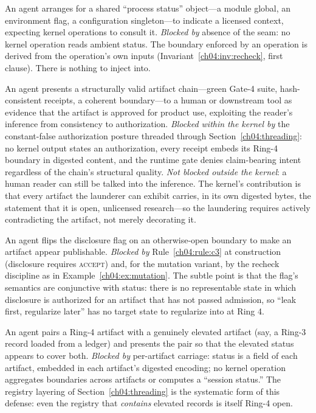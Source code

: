 \begin{example}\label{ch04:ex:ambient}
An agent arranges for a shared ``process status'' object---a module global,
an environment flag, a configuration singleton---to indicate a licensed
context, expecting kernel operations to consult it. \emph{Blocked by}
absence of the seam: no kernel operation reads ambient status. The boundary
enforced by an operation is derived from the operation's own inputs
(Invariant~\ref{ch04:inv:recheck}, first clause). There is nothing to
inject into.
\end{example}

\begin{example}\label{ch04:ex:laundering}
An agent presents a structurally valid artifact chain---green Gate-4 suite,
hash-consistent receipts, a coherent boundary---to a human or downstream
tool as evidence that the artifact is approved for product use, exploiting
the reader's inference from consistency to authorization. \emph{Blocked
within the kernel by} the constant-false authorization posture threaded
through Section~\ref{ch04:threading}: no kernel output states an
authorization, every receipt embeds its Ring-4 boundary in digested content,
and the runtime gate denies claim-bearing intent regardless of the chain's
structural quality. \emph{Not blocked outside the kernel}: a human reader
can still be talked into the inference. The kernel's contribution is that
every artifact the launderer can exhibit carries, in its own digested bytes,
the statement that it is open, unlicensed research---so the laundering
requires actively contradicting the artifact, not merely decorating it.
\end{example}

\begin{example}\label{ch04:ex:disclosure}
An agent flips the disclosure flag on an otherwise-open boundary to make an
artifact appear publishable. \emph{Blocked by} Rule~\ref{ch04:rule:c3} at
construction (disclosure requires \textsc{accept}) and, for the mutation
variant, by the recheck discipline as in Example~\ref{ch04:ex:mutation}.
The subtle point is that the flag's semantics are conjunctive with status:
there is no representable state in which disclosure is authorized for an
artifact that has not passed admission, so ``leak first, regularize later''
has no target state to regularize into at Ring 4.
\end{example}

\begin{example}\label{ch04:ex:borrowing}
An agent pairs a Ring-4 artifact with a genuinely elevated artifact (say, a
Ring-3 record loaded from a ledger) and presents the pair so that the
elevated status appears to cover both. \emph{Blocked by} per-artifact
carriage: status is a field of each artifact, embedded in each artifact's
digested encoding; no kernel operation aggregates boundaries across
artifacts or computes a ``session status.'' The registry layering of
Section~\ref{ch04:threading} is the systematic form of this defense: even
the registry that \emph{contains} elevated records is itself Ring-4 open.
\end{example}

